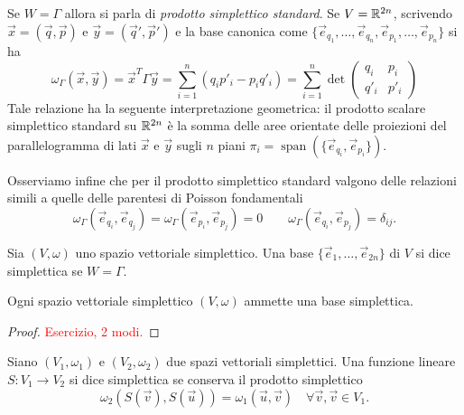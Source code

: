 Se $ W = \Gamma $ allora si parla di \emph{prodotto simplettico standard}. Se $ V = \mathbb{R}^{2n} $, scrivendo $ \vec{x} = (\vec{q}, \vec{p}) $ e $ \vec{y} = (\vec{q}', \vec{p}') $ e la base canonica come $ \{\vec{e}_{q_1}, \ldots, \vec{e}_{q_n}, \vec{e}_{p_1}, \ldots, \vec{e}_{p_n}\} $ si ha
\begin{equation}
    \omega_\Gamma(\vec{x}, \vec{y}) = \vec{x}^T \Gamma \vec{y} = \sum_{i=1}^{n} \left(q_i p'_i - p_i q'_i\right) =
    \sum_{i=1}^{n}
    \det{
    \begin{pmatrix}
    q_i & p_i \\
    q'_i & p'_i
    \end{pmatrix}
    }
\end{equation}
Tale relazione ha la seguente interpretazione geometrica: il prodotto scalare simplettico standard su $ \mathbb{R}^{2n} $ è la somma delle aree orientate delle proiezioni del parallelogramma di lati $ \vec{x} $ e $ \vec{y} $ sugli $ n $ piani $ \pi_i = \operatorname{span}\left(\{\vec{e}_{q_i}, \vec{e}_{p_i}\}\right) $.

Osserviamo infine che per il prodotto simplettico standard valgono delle relazioni simili a quelle delle parentesi di Poisson fondamentali
\begin{equation}
    \omega_\Gamma(\vec{e}_{q_i}, \vec{e}_{q_j}) = \omega_\Gamma(\vec{e}_{p_i}, \vec{e}_{p_j}) = 0 \qquad \omega_\Gamma(\vec{e}_{q_i}, \vec{e}_{p_j}) = \delta_{ij}.
\end{equation}

\begin{definition}
    Sia $ (V, \omega) $ uno spazio vettoriale simplettico. Una base $ \{\vec{e}_1, \ldots, \vec{e}_{2n}\} $ di $ V $ si dice simplettica se $ W = \Gamma $.
\end{definition}

\begin{thm}
    Ogni spazio vettoriale simplettico $ (V, \omega) $ ammette una base simplettica.
\end{thm}
\begin{proof}
    \textcolor{red}{Esercizio, 2 modi.}
\end{proof}

\begin{definition}
    Siano $ (V_1, \omega_1) $ e $ (V_2, \omega_2) $ due spazi vettoriali simplettici. Una funzione lineare $ S \colon V_1 \to V_2 $ si dice simplettica se conserva il prodotto simplettico
    \[
        \omega_2(S(\vec{v}), S(\vec{u})) = \omega_1(\vec{u}, \vec{v}) \quad \forall \vec{v}, \vec{v} \in V_1.
    \]
\end{definition}

